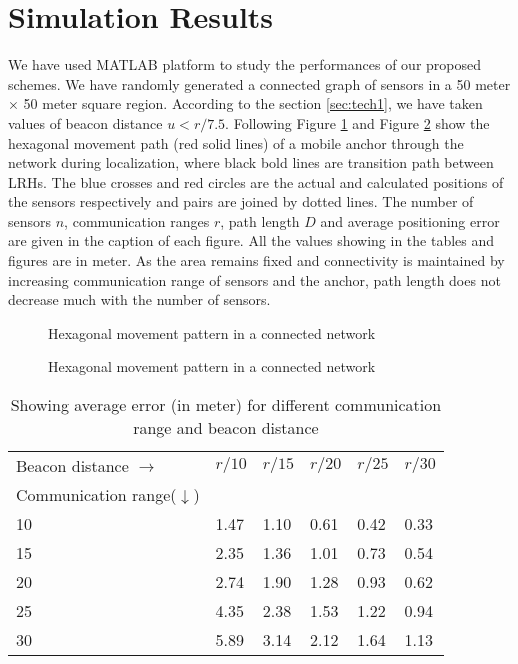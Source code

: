 \documentclass[preprint,11pt]{elsarticle}
\begin{document}
\section{Simulation Results}
\label{sec:sim}
We have used MATLAB platform to study the performances of our proposed schemes. We have randomly generated a connected graph of
sensors in a 50 meter $\times$ 50 meter square region. According to the section \ref{sec:tech1}, we have taken values of beacon
distance $u < r/7.5$. Following Figure \ref{f:fig11} and Figure \ref{f:fig12} show the hexagonal movement path (red solid lines)
of a mobile anchor through the network during localization, where black bold lines are transition path between LRHs.
The blue crosses and red circles are the actual and calculated positions of the sensors respectively and pairs are joined by dotted lines.
The number of sensors $n$, communication ranges $r$, path length $D$ and average positioning error are given in the caption of each figure.
All the values showing in the tables and figures are in meter. As the area remains fixed and connectivity is maintained by increasing
communication range of sensors and the anchor, path length does not decrease much with the number of sensors.
\begin{figure}[h]
\centering
{}
\caption{Hexagonal movement pattern in a connected network}
\label{f:fig11}
\end{figure}
\begin{figure}[h]
\centering
{}
\caption{Hexagonal movement pattern in a connected network}
\label{f:fig12}
\end{figure}
\begin{table}[]
\centering
\caption{Showing average error (in meter) for different communication range and beacon distance \label{table:5}}
\begin{tabular}
{p{4.5cm}|p{1.2cm}|p{1.2cm}|p{1.2cm}|p{1.2cm}|p{1.2cm} }
\hline
\hline
Beacon distance $\rightarrow$  & $r/10$ &$r/15$  &$r/20$  &$r/25$  &$r/30$  \\
Communication range($\downarrow$)  &&&&&\\
\hline
10 &1.47  & 1.10 & 0.61 & 0.42 & 0.33  \\
15 &2.35  & 1.36 & 1.01 & 0.73 & 0.54 \\
20 &2.74  & 1.90 & 1.28 & 0.93 & 0.62 \\
25 &4.35  & 2.38 & 1.53 & 1.22 & 0.94 \\
30 &5.89  & 3.14 & 2.12 & 1.64 & 1.13 \\
\hline
\hline
\end{tabular}
\end{table}
\end{document}
